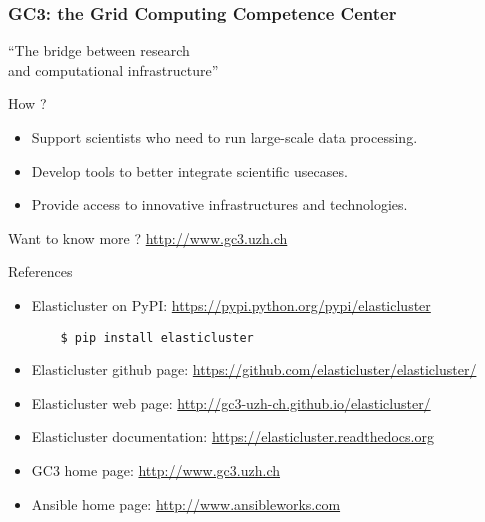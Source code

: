 \documentclass[english,serif,mathserif,usenames,dvipsnames]{beamer}
\begin{document}
\begin{frame}
  \frametitle{GC3: the Grid Computing Competence Center}
    
  \begin{block}{}
     \begin{center}
       \large {\color{Blue}``The bridge between research \\ and computational infrastructure''}
     \end{center}
  \end{block} 

  \begin{block}{How ?}
    \begin{itemize}
    \item {\color{Blue}Support} scientists who need to run large-scale data processing. \\
    \item {\color{Blue}Develop} tools to better {\color{Blue}integrate} scientific usecases.
    \item Provide access to {\color{Blue}innovative} infrastructures and technologies. \\
    \end{itemize}
  \end{block}
  
  \begin{block}{}
    {\color{Blue}\small{Want to know more ? }\url{http://www.gc3.uzh.ch}}
  \end{block}
  
\end{frame}

\begin{frame}[fragile]
  {References}
  \begin{itemize}
  \item Elasticluster on PyPI:
    \url{https://pypi.python.org/pypi/elasticluster}

\begin{verbatim}
    $ pip install elasticluster
\end{verbatim}

  \item Elasticluster github page: 
    \url{https://github.com/elasticluster/elasticluster/}
  \item Elasticluster web page: 
    \url{http://gc3-uzh-ch.github.io/elasticluster/}
  \item Elasticluster documentation:
    \url{https://elasticluster.readthedocs.org}
  \item GC3 home page: \url{http://www.gc3.uzh.ch}
  \item Ansible home page: \url{http://www.ansibleworks.com}
  \end{itemize}
\end{frame}
\end{document}
